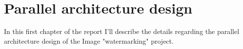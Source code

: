\chapter{Parallel architecture design} %
\label{cha:parallel_architecture_design}
    In this first chapter of the report I'll describe the details regarding the parallel architecture design of the
    Image "watermarking" project.
